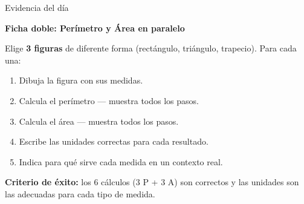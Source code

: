 \documentclass[aspectratio=169, 10pt, spanish]{beamer}
\begin{document}
\begin{frame}{Evidencia del día}
  \begin{evidenciabox}
    \textbf{Ficha doble: Perímetro y Área en paralelo}

    \vspace{0.2cm}
    Elige \textbf{3 figuras} de diferente forma (rectángulo, triángulo,
    trapecio). Para cada una:
    \begin{enumerate}
      \item Dibuja la figura con sus medidas.
      \item Calcula el perímetro — muestra todos los pasos.
      \item Calcula el área — muestra todos los pasos.
      \item Escribe las unidades correctas para cada resultado.
      \item Indica para qué sirve cada medida en un contexto real.
    \end{enumerate}
    \vspace{0.2cm}
    \textbf{Criterio de éxito:} los 6 cálculos (3 P + 3 A) son correctos
    y las unidades son las adecuadas para cada tipo de medida.
  \end{evidenciabox}
\end{frame}
\end{document}
